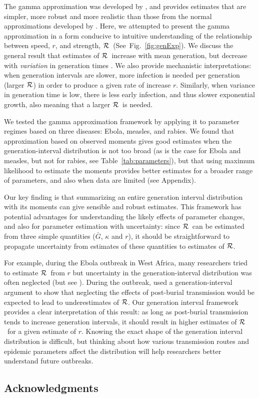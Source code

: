 \documentclass[12pt,]{article}
\newcommand{\RR}{\ensuremath{{\cal R}}}
\newcommand{\fref}[1]{Fig.~\ref{fig:#1}}
\newcommand{\tref}[1]{Table~\ref{tab:#1}}
\begin{document}
The gamma approximation was developed by \cite{NishCast09}, and  
provides estimates that are simpler, more robust and more realistic than those from the normal approximations developed by \cite{WallLips07}.
Here, we attempted to present the gamma approximation in a form conducive to intuitive understanding of the relationship between speed, $r$, and strength, \RR\ (See~\fref{genExp}).
We discuss the general result that estimates of \RR\ increase with mean generation, but decrease with \emph{variation} in generation times \cite{WallLips07}. 
We also provide mechanistic interpretations: when generation intervals are slower, more infection is needed per generation (larger \RR)  in order to produce a given rate of increase $r$. Similarly, when variance in generation time is low, there is less early infection, and thus slower exponential growth, also meaning that a larger \RR\ is needed. 

We tested the gamma approximation framework by applying it to parameter regimes based on three diseases: Ebola, measles, and rabies. 
We found that approximation based on observed moments gives good estimates when the generation-interval distribution is not too broad (as is the case for Ebola and measles, but not for rabies, see \tref{parameters}), but that using maximum likelihood to estimate the moments provides better estimates for a broader range of parameters, and also when data are limited (see Appendix).

Our key finding is that summarizing an entire generation interval distribution with its moments can give sensible and robust estimates.
This framework has potential advantages for understanding the likely effects of parameter changes, and also for parameter estimation with uncertainty: since \RR\ can be estimated from three simple quantities ($\bar G$, $\kappa$ and $r$), it should be straightforward to propagate uncertainty from estimates of these quantities to estimates of \RR.

For example, during the Ebola outbreak in West Africa, many researchers tried to estimate \RR\ from $r$ \cite{Alth14, AylwBarb14, Others_p, KingDome15} but uncertainty in the generation-interval distribution was often neglected (but see \cite{TaylDush16}).  
During the outbreak, \cite{WeitDush15} used a generation-interval argument to  show that neglecting the effects of post-burial transmission would be expected to lead to underestimates of \RR.
Our generation interval framework provides a clear interpretation of this result: as long as post-burial transmission tends to increase generation intervals, it should result in higher estimates of \RR\ for a given estimate of $r$.
Knowing the exact shape of the generation interval distribution is difficult, but thinking about how various transmission routes and epidemic parameters affect the distribution will help researchers better understand future outbreaks.

\subsection*{Acknowledgments}

\printbibliography
\end{document}
